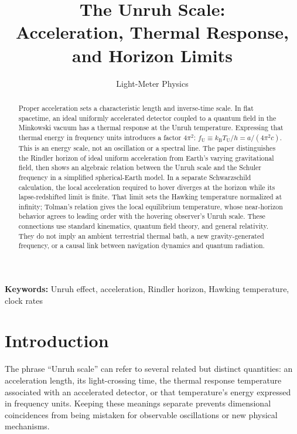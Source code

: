 \documentclass[12pt]{article}
\title{The Unruh Scale:\\
Acceleration, Thermal Response, and Horizon Limits}
\author{Light-Meter Physics}
\date{}
\begin{document}
\maketitle

\begin{abstract}
Proper acceleration sets a characteristic length and inverse-time scale. In flat spacetime, an ideal uniformly accelerated detector coupled to a quantum field in the Minkowski vacuum has a thermal response at the Unruh temperature. Expressing that thermal energy in frequency units introduces a factor $4\pi^2$: $f_{\mathrm{U}}\equiv k_{\mathrm{B}}T_{\mathrm{U}}/h=a/(4\pi^2c)$. This is an energy scale, not an oscillation or a spectral line. The paper distinguishes the Rindler horizon of ideal uniform acceleration from Earth's varying gravitational field, then shows an algebraic relation between the Unruh scale and the Schuler frequency in a simplified spherical-Earth model. In a separate Schwarzschild calculation, the local acceleration required to hover diverges at the horizon while its lapse-redshifted limit is finite. That limit sets the Hawking temperature normalized at infinity; Tolman's relation gives the local equilibrium temperature, whose near-horizon behavior agrees to leading order with the hovering observer's Unruh scale. These connections use standard kinematics, quantum field theory, and general relativity. They do not imply an ambient terrestrial thermal bath, a new gravity-generated frequency, or a causal link between navigation dynamics and quantum radiation.
\end{abstract}

\noindent\textbf{Keywords:} Unruh effect, acceleration, Rindler horizon, Hawking temperature, clock rates

\section{Introduction}

The phrase ``Unruh scale'' can refer to several related but distinct quantities: an acceleration length, its light-crossing time, the thermal response temperature associated with an accelerated detector, or that temperature's energy expressed in frequency units. Keeping these meanings separate prevents dimensional coincidences from being mistaken for observable oscillations or new physical mechanisms.
\end{document}
